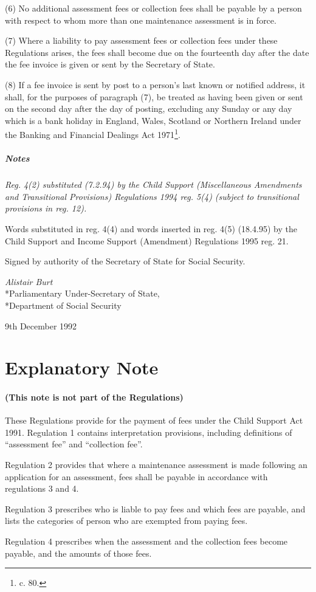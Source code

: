 \documentclass[a4paper]{article}
\newcommand{\parthead}{}
\newcommand\amendment[1]{\subsubsection*{Notes}{\itshape\frenchspacing\footnotesize #1 \par}}
\begin{document}
(6) No additional assessment fees or collection fees shall be payable by a person with respect to whom more than one maintenance assessment is in force.

(7) Where a liability to pay assessment fees or collection fees under these Regulations arises, the fees shall become due on the fourteenth day after the date the fee invoice is given or sent by the Secretary of State.

(8) If a fee invoice is sent by post to a person’s last known or notified address, it shall, for the purposes of paragraph (7), be treated as having been given or sent on the second day after the day of posting, excluding any Sunday or any day which is a bank holiday in England, Wales, Scotland or Northern Ireland under the Banking and Financial Dealings Act 1971\footnote{ c. 80.}.

\amendment{
Reg. 4(2) substituted (7.2.94) by the Child Support (Miscellaneous Amendments and Transitional Provisions) Regulations 1994 reg. 5(4) (subject to transitional provisions in reg. 12).

Words substituted in reg. 4(4) and words inserted in reg. 4(5) (18.4.95) by the Child Support and Income Support (Amendment) Regulations 1995 reg. 21.
}

\bigskip

Signed by authority of the Secretary of State for Social Security.

{\raggedleft
\emph{Alistair Burt}\\*Parliamentary Under-Secretary of State,\\*Department of Social Security

}

9th December 1992

\part{Explanatory Note}

\renewcommand\parthead{--- Explanatory Note}

\subsection*{(This note is not part of the Regulations)}

 These Regulations provide for the payment of fees under the Child Support Act 1991. Regulation 1 contains interpretation provisions, including definitions of “assessment fee” and “collection fee”.

  Regulation 2 provides that where a maintenance assessment is made following an application for an assessment, fees shall be payable in accordance with regulations 3 and 4.

  Regulation 3 prescribes who is liable to pay fees and which fees are payable, and lists the categories of person who are exempted from paying fees.

  Regulation 4 prescribes when the assessment and the collection fees become payable, and the amounts of those fees.
\end{document}
